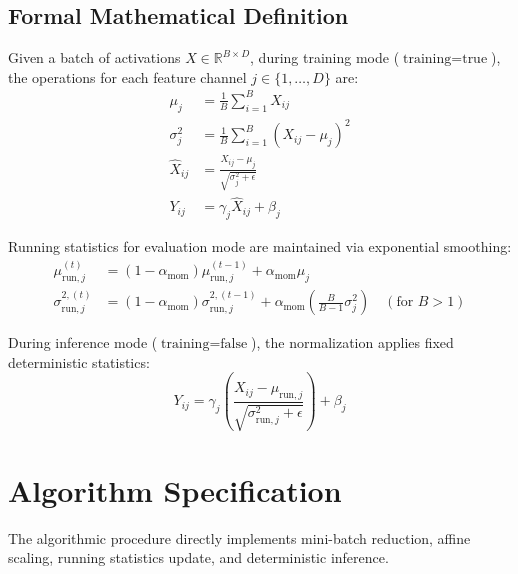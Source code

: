\documentclass[11pt,a4paper]{article}
\theoremstyle{definition}
\begin{document}
\subsection{Formal Mathematical Definition}
Given a batch of activations $X \in \mathbb{R}^{B \times D}$, during training mode ($\text{training} = \text{true}$), the operations for each feature channel $j \in \{1, \dots, D\}$ are:
\begin{align}
\mu_j &= \frac{1}{B} \sum_{i=1}^B X_{ij} \\
\sigma_j^2 &= \frac{1}{B} \sum_{i=1}^B (X_{ij} - \mu_j)^2 \\
\hat{X}_{ij} &= \frac{X_{ij} - \mu_j}{\sqrt{\sigma_j^2 + \epsilon}} \\
Y_{ij} &= \gamma_j \hat{X}_{ij} + \beta_j
\end{align}

Running statistics for evaluation mode are maintained via exponential smoothing:
\begin{align}
\mu_{\text{run}, j}^{(t)} &= (1 - \alpha_{\text{mom}}) \mu_{\text{run}, j}^{(t-1)} + \alpha_{\text{mom}} \mu_j \\
\sigma_{\text{run}, j}^{2, (t)} &= (1 - \alpha_{\text{mom}}) \sigma_{\text{run}, j}^{2, (t-1)} + \alpha_{\text{mom}} \left( \frac{B}{B - 1} \sigma_j^2 \right) \quad (\text{for } B > 1)
\end{align}

During inference mode ($\text{training} = \text{false}$), the normalization applies fixed deterministic statistics:
\begin{equation}
Y_{ij} = \gamma_j \left( \frac{X_{ij} - \mu_{\text{run}, j}}{\sqrt{\sigma_{\text{run}, j}^2 + \epsilon}} \right) + \beta_j
\end{equation}

\section{Algorithm Specification}

The algorithmic procedure directly implements mini-batch reduction, affine scaling, running statistics update, and deterministic inference.
\end{document}
